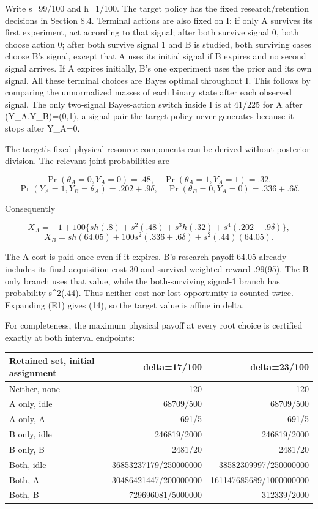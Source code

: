 \documentclass[
  11pt,
]{article}
\begin{document}
Write s=99/100 and h=1/100. The target policy has the fixed
research/retention decisions in Section 8.4. Terminal actions are also
fixed on I: if only A survives its first experiment, act according to
that signal; after both survive signal 0, both choose action 0; after
both survive signal 1 and B is studied, both surviving cases choose B's
signal, except that A uses its initial signal if B expires and no second
signal arrives. If A expires initially, B's one experiment uses the
prior and its own signal. All these terminal choices are Bayes optimal
throughout I. This follows by comparing the unnormalized masses of each
binary state after each observed signal. The only two-signal
Bayes-action switch inside I is at 41/225 for A after (Y\_A,Y\_B)=(0,1),
a signal pair the target policy never generates because it stops after
Y\_A=0.

The target's fixed physical resource components can be derived without
posterior division. The relevant joint probabilities are

\[\Pr(\theta_A=0,Y_A=0)=.48,\quad
\Pr(\theta_A=1,Y_A=1)=.32,\]
\[\Pr(Y_A=1,Y_B=\theta_A)=.202+.9\delta,\quad
\Pr(\theta_B=0,Y_A=0)=.336+.6\delta.\]

Consequently

\[X_A=-1+100\{sh(.8)+s^2(.48)+s^3h(.32)
+s^4(.202+.9\delta)\},\] \[X_B=sh(64.05)+100s^2(.336+.6\delta)
+s^2(.44)(64.05). \tag{E1}\]

The A cost is paid once even if it expires. B's research payoff 64.05
already includes its final acquisition cost 30 and survival-weighted
reward .99(95). The B-only branch uses that value, while the
both-surviving signal-1 branch has probability s\^{}2(.44). Thus neither
cost nor lost opportunity is counted twice. Expanding (E1) gives (14),
so the target value is affine in delta.

For completeness, the maximum physical payoff at every root choice is
certified exactly at both interval endpoints:

\begin{longtable}[]{@{}lrr@{}}
\toprule\noalign{}
Retained set, initial assignment & delta=17/100 & delta=23/100 \\
\midrule\noalign{}
\endhead
\bottomrule\noalign{}
\endlastfoot
Neither, none & 120 & 120 \\
A only, idle & 68709/500 & 68709/500 \\
A only, A & 691/5 & 691/5 \\
B only, idle & 246819/2000 & 246819/2000 \\
B only, B & 2481/20 & 2481/20 \\
Both, idle & 36853237179/250000000 & 38582309997/250000000 \\
Both, A & 30486421447/200000000 & 161147685689/1000000000 \\
Both, B & 729696081/5000000 & 312339/2000 \\
\end{longtable}
\end{document}
